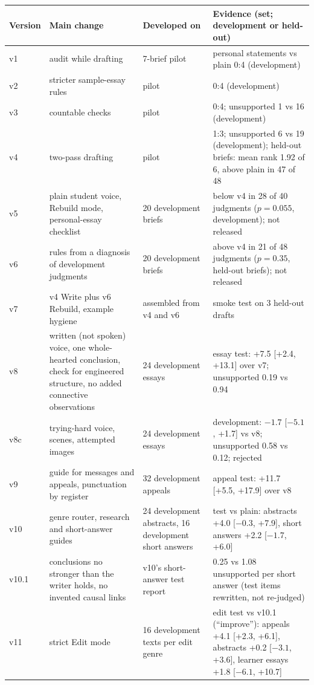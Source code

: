 \documentclass[11pt]{article}
\begin{document}
\begin{table}[t]
\centering\small
\setlength{\tabcolsep}{4pt}
\begin{tabular}{lp{4.6cm}p{2.9cm}p{6.4cm}}
\toprule
Version & Main change & Developed on & Evidence (set; development or held-out) \\
\midrule
v1 & audit while drafting & 7-brief pilot & personal statements vs plain 0:4 (development) \\
v2 & stricter sample-essay rules & pilot & 0:4 (development) \\
v3 & countable checks & pilot & 0:4; unsupported 1 vs 16 (development) \\
v4 & two-pass drafting & pilot & 1:3; unsupported 6 vs 19 (development); held-out briefs: mean rank 1.92 of 6, above plain in 47 of 48 \\
v5 & plain student voice, Rebuild mode, personal-essay checklist & 20 development briefs & below v4 in 28 of 40 judgments ($p = 0.055$, development); not released \\
v6 & rules from a diagnosis of development judgments & 20 development briefs & above v4 in 21 of 48 judgments ($p = 0.35$, held-out briefs); not released \\
v7 & v4 Write plus v6 Rebuild, example hygiene & assembled from v4 and v6 & smoke test on 3 held-out drafts \\
v8 & written (not spoken) voice, one whole-hearted conclusion, check for engineered structure, no added connective observations & 24 development essays & essay test: +7.5 [+2.4, +13.1] over v7; unsupported 0.19 vs 0.94 \\
v8c & trying-hard voice, scenes, attempted images & 24 development essays & development: $-1.7$ [$-5.1$, +1.7] vs v8; unsupported 0.58 vs 0.12; rejected \\
v9 & guide for messages and appeals, punctuation by register & 32 development appeals & appeal test: +11.7 [+5.5, +17.9] over v8 \\
v10 & genre router, research and short-answer guides & 24 development abstracts, 16 development short answers & test vs plain: abstracts +4.0 [$-0.3$, +7.9], short answers +2.2 [$-1.7$, +6.0] \\
v10.1 & conclusions no stronger than the writer holds, no invented causal links & v10's short-answer test report & 0.25 vs 1.08 unsupported per short answer (test items rewritten, not re-judged) \\
v11 & strict Edit mode & 16 development texts per edit genre & edit test vs v10.1 (``improve''): appeals +4.1 [+2.3, +6.1], abstracts +0.2 [$-3.1$, +3.6], learner essays +1.8 [$-6.1$, +10.7] \\

\end{tabular}
\end{table}
\end{document}
